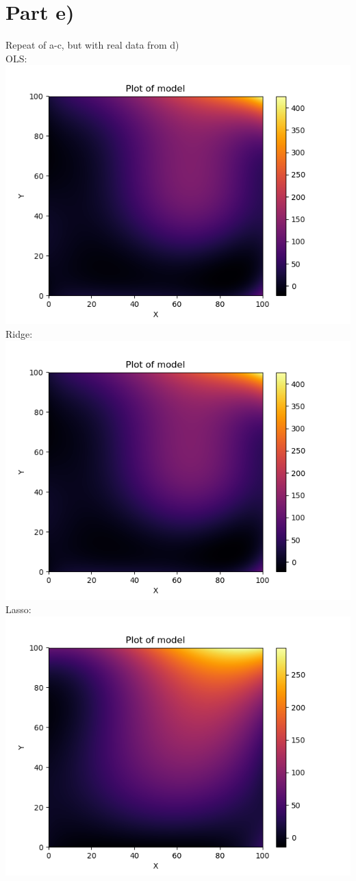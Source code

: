 \documentclass[a4paper,norsk]{article}
\begin{document}
\section*{Part e)}
Repeat of a-c, but with real data from d)
\\OLS:
\\ \includegraphics[scale=.7]{parteOLS}
\\Ridge:
\\ \includegraphics[scale=.7]{parteRidge}
\\Lasso:
\\ \includegraphics[scale=.7]{parteLasso}
\end{document}
